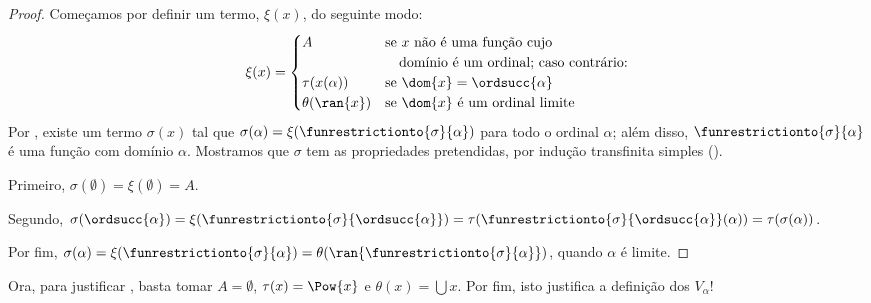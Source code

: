 \documentclass[../../../include/open-logic-section]{subfiles}
\begin{document}
\begin{proof}
Começamos por definir um termo, $\xi(x)$, do seguinte modo: 
\[
	\xi(x) = 
	\begin{cases}
			A &\text{se $x$ não é uma função cujo}\\
			&\hspace{1em}\text{domínio é um ordinal; caso contrário:}\\
			\tau(x(\alpha)) & \text{se $\dom{x} = \ordsucc{\alpha}$}\\
			\theta(\ran{x}) & \text{se $\dom{x}$ é um ordinal limite}
	\end{cases}
\]
Por , existe um termo $\sigma(x)$ tal que
$\sigma(\alpha) = \xi(\funrestrictionto{\sigma}{\alpha})$ para todo o
ordinal $\alpha$; além disso, $\funrestrictionto{\sigma}{\alpha}$ é uma
função com domínio $\alpha$. Mostramos que $\sigma$ tem as propriedades
pretendidas, por indução transfinita simples
(). 

Primeiro, $\sigma(\emptyset) = \xi(\emptyset) = A$. 

Segundo, $\sigma(\ordsucc{\alpha}) = \xi(\funrestrictionto{\sigma}{\ordsucc{\alpha}}) = \tau(\funrestrictionto{\sigma}{\ordsucc{\alpha}}(\alpha)) = \tau(\sigma(\alpha))$.

Por fim, $\sigma(\alpha) = \xi(\funrestrictionto{\sigma}{\alpha}) = \theta(\ran{\funrestrictionto{\sigma}{\alpha}})$, quando $\alpha$ é limite.
\end{proof}
\noindent
Ora, para justificar , basta tomar $A
= \emptyset$, $\tau(x) = \Pow{x}$ e $\theta(x) = \bigcup x$. Por fim, isto justifica a definição dos $V_\alpha$!{}
\end{document}
